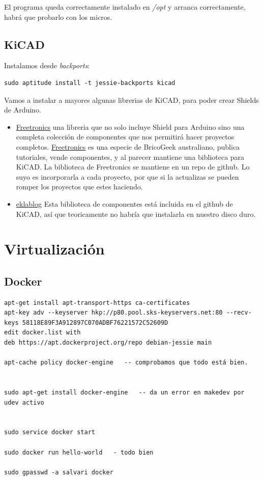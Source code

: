 \documentclass[12pt,spanish,]{article}
\providecommand{\tightlist}{%
  \setlength{\itemsep}{0pt}\setlength{\parskip}{0pt}}
\begin{document}
El programa queda correctamente instalado en \emph{/opt} y arranca
correctamente, habrá que probarlo con los micros.

\subsection{KiCAD}\label{kicad}

Instalamos desde \emph{backports}:

\begin{verbatim}
sudo aptitude install -t jessie-backports kicad
\end{verbatim}

Vamos a instalar a mayores algunas librerias de KiCAD, para poder crear
Shields de Arduino.

\begin{itemize}
\tightlist
\item
  \href{https://github.com/freetronics/freetronics_kicad_library}{Freetronics}
  una libreria que no solo incluye Shield para Arduino sino una completa
  colección de componentes que nos permitirá hacer proyectos completos.
  \href{http://www.freetronics.com}{Freetronics} es una especie de
  BricoGeek australiano, publica tutoriales, vende componentes, y al
  parecer mantiene una biblioteca para KiCAD. La biblioteca de
  Freetronics se mantiene en un repo de github. Lo suyo es incorporarla
  a cada proyecto, por que si la actualizas se pueden romper los
  proyectos que estes haciendo.
\item
  \href{http://meta-blog.eklablog.com/kicad-librairie-arduino-pretty-p930786}{eklablog}
  Esta biblioteca de componentes está incluida en el github de KiCAD,
  así que teoricamente no habría que instalarla en nuestro disco duro.
\end{itemize}

\section{Virtualización}\label{virtualizaciuxf3n}

\subsection{Docker}\label{docker}

\begin{verbatim}
apt-get install apt-transport-https ca-certificates
apt-key adv --keyserver hkp://p80.pool.sks-keyservers.net:80 --recv-keys 58118E89F3A912897C070ADBF76221572C52609D
edit docker.list with
deb https://apt.dockerproject.org/repo debian-jessie main

apt-cache policy docker-engine   -- comprobamos que todo está bien.


sudo apt-get install docker-engine   -- da un error en makedev por udev activo


sudo service docker start

sudo docker run hello-world   - todo bien

sudo gpasswd -a salvari docker
\end{verbatim}
\end{document}
